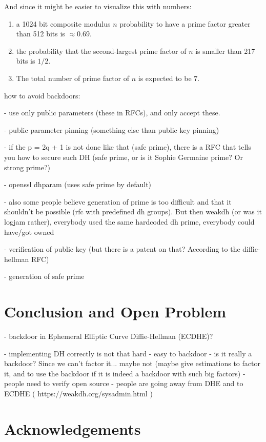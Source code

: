 \documentclass[a4paper,11pt,twocolumn]{article}
\begin{document}
And since it might be easier to visualize this with numbers:

\begin{enumerate}
    \item a 1024 bit composite modulus $n$ probability to have a prime factor greater than 512 bits is $\approx 0.69$.
    \item the probability that the second-largest prime factor of $n$ is smaller than 217 bits is $1/2$.
    \item The total number of prime factor of $n$ is expected to be $7$.
\end{enumerate}

how to avoid backdoors:

- use only public parameters (these in RFCs), and only accept these. 

- public parameter pinning (something else than public key pinning)

- if the p = 2q + 1 is not done like that (safe prime), there is a RFC that tells you how to secure such DH (safe prime, or is it Sophie Germaine prime? Or strong prime?)

- openssl dhparam (uses safe prime by default)

- also some people believe generation of prime is too difficult and that it shouldn't be possible (rfc with predefined dh groups). But then weakdh (or was it logjam rather), everybody used the same hardcoded dh prime, everybody could have/got owned

- verification of public key (but there is a patent on that? According to the diffie-hellman RFC)

- generation of safe prime


\section{Conclusion and Open Problem}

- backdoor in Ephemeral Elliptic Curve Diffie-Hellman (ECDHE)?

- implementing DH correctly is not that hard
- easy to backdoor
- is it really a backdoor? Since we can't factor it... maybe not (maybe give estimations to factor it, and to use the backdoor if it is indeed a backdoor with such big factors)
- people need to verify open source
- people are going away from DHE and to ECDHE ( https://weakdh.org/sysadmin.html )
\newpage

\section*{Acknowledgements}
\end{document}
